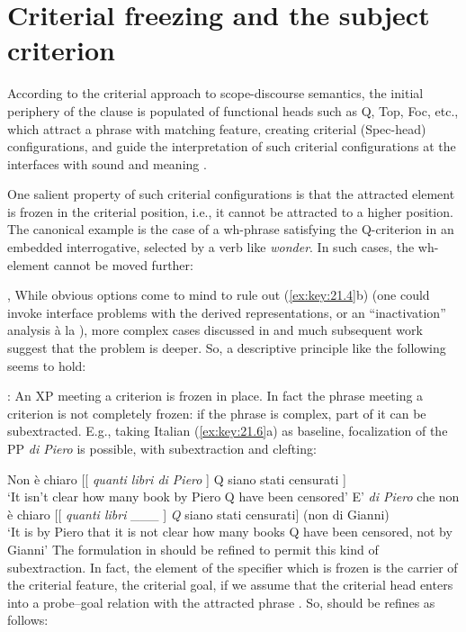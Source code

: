 \documentclass[output=paper]{langsci/langscibook}
\begin{document}
\section{Criterial freezing and the subject criterion}

According to the criterial approach  to scope-discourse semantics, the initial
periphery of the clause is populated of functional heads such as Q, Top, Foc,
etc., which attract a phrase with matching feature, creating criterial
(Spec-head) configurations, and guide the interpretation of such criterial
configurations at the interfaces with sound and meaning \citep{Rizzi1997}.

One salient property of such criterial configurations is that the attracted
element is frozen in the criterial position, i.e., it cannot be attracted to a
higher position. The canonical example is the case of a wh-phrase satisfying
the Q-criterion in an embedded interrogative, selected by a verb like
\emph{wonder}. In such cases, the wh-element cannot be moved further:

\ea%
    \label{ex:key:21.4} \textcite{LasnikSaito1992}, \textcite{Boskovic2008}
    \z
\z
%
While obvious options come to mind to rule out (\ref{ex:key:21.4}b) (one could
invoke interface problems with the derived representations, or an
“inactivation” analysis à la \citealt{Boskovic2008}), more complex cases
discussed in \textcite{rizzicriterial,Rizzi2011} and much subsequent work suggest that the
problem is deeper. So, a descriptive principle like the following seems to
hold:

\ea%
    \label{ex:key:21.5}
    : An XP meeting a criterion is frozen in place.
\z
%
In fact the phrase meeting a criterion is not completely frozen: if the phrase
is complex, part of it can be subextracted. E.g., taking Italian
(\ref{ex:key:21.6}a) as baseline, focalization of the PP \emph{di Piero} is
possible, with subextraction and clefting:

\ea%
    \label{ex:key:21.6}
    \ea Non è chiaro   [[ \emph{quanti libri di Piero} ] Q siano stati censurati ]\\
        ‘It isn’t clear       how many book by Piero Q have been censored’
    \ex E’ \emph{di Piero} che non è chiaro [[ \emph{quanti libri} \_\_\_ ] \emph{Q}  siano stati censurati] (non di Gianni)\\
        ‘It is by Piero that it is not clear how many books Q have been censored, not by Gianni’
    \z
\z
%
The formulation in  should be refined to permit this kind of
subextraction. In fact, the element of the specifier which is frozen is the
carrier of the criterial feature, the criterial goal, if we assume that the
criterial head enters into a probe--goal relation with the attracted phrase
\citep{Chomsky2000}. So,  should be refines as follows:
\end{document}
